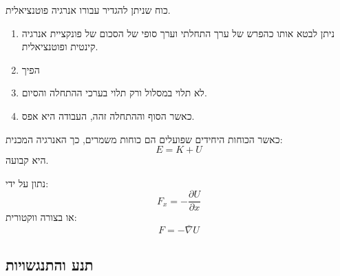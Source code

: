 \documentclass{tstextbook}
\begin{document}
\begin{definition}
כוח שניתן להגדיר עבורו אנרגיה פוטנציאלית. 

\end{definition}
\begin{proposition}
  \begin{enumerate}
    \item ניתן לבטא אותו כהפרש של ערך התחלתי וערך סופי של הסכום של פונקציית אנרגיה קינטית ופוטנציאלית. 


    \item הפיך 


    \item לא תלוי במסלול ורק תלוי בערכי ההתחלה והסיום. 


    \item כאשר הסוף וההתחלה זהה, העבודה היא אפס. 


  \end{enumerate}
\end{proposition}
\begin{corollary}
כאשר הכוחות היחידים שפועלים הם כוחות משמרים, כך האנרגיה המכנית:
$$E=K+U$$
היא קבועה.

\end{corollary}
\begin{proposition}
נתון על ידי:
$$F_{x}=-\frac{\partial U}{\partial x} $$
או בצורה ווקטורית:
$$F=-\bar{\nabla} U$$

\end{proposition}
\subsection{תנע והתנגשויות}
\end{document}
